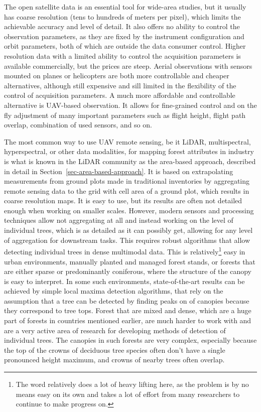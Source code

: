 The open satellite data is an essential tool for wide-area studies, but it usually has coarse resolution (tens to hundreds of meters per pixel), which limits the achievable accuracy and level of detail.
It also offers no ability to control the observation parameters, as they are fixed by the instrument configuration and orbit parameters, both of which are outside the data consumer control.
Higher resolution data with a limited ability to control the acquisition parameters is available commercially, but the prices are steep.
Aerial observations with sensors mounted on planes or helicopters are both more controllable and cheaper alternatives, although still expensive and sill limited in the flexibility of the control of acquisition parameters.
A much more affordable and controllable alternative is UAV-based observation.
It allows for fine-grained control and on the fly adjustment of many important parameters such as flight height, flight path overlap, combination of used sensors, and so on.

The most common way to use UAV remote sensing, be it LiDAR, multispectral, hyperspectral, or other data modalities, for mapping forest attributes in industry is what is known in the LiDAR community as the area-based approach, described in detail in Section~\ref{sec-area-based-approach}.
It is based on extrapolating measurements from ground plots made in traditional inventories by aggregating remote sensing data to the grid with cell area of a ground plot, which results in coarse resolution maps.
It is easy to use, but its results are often not detailed enough when working on smaller scales.
However, modern sensors and processing techniques allow not aggregating at all and instead working on the level of individual trees, which is as detailed as it can possibly get, allowing for any level of aggregation for downstream tasks.
This requires robust algorithms that allow detecting individual trees in dense multimodal data.
This is relatively\footnote{The word relatively does a lot of heavy lifting here, as the problem is by no means easy on its own and takes a lot of effort from many researchers to continue to make progress on.
} easy in urban environments, manually planted and managed forest stands, or forests that are either sparse or predominantly coniferous, where the structure of the canopy is easy to interpret.
In some such environments, state-of-the-art results can be achieved by simple local maxima detection algorithms, that rely on the assumption that a tree can be detected by finding peaks on of canopies because they correspond to tree tops.
Forest that are mixed and dense, which are a huge part of forests in countries mentioned earlier, are much harder to work with and are a very active area of research for developing methods of detection of individual trees.
The canopies in such forests are very complex, especially because the top of the crowns of deciduous tree species often don't have a single pronounced height maximum, and crowns of nearby trees often overlap.


